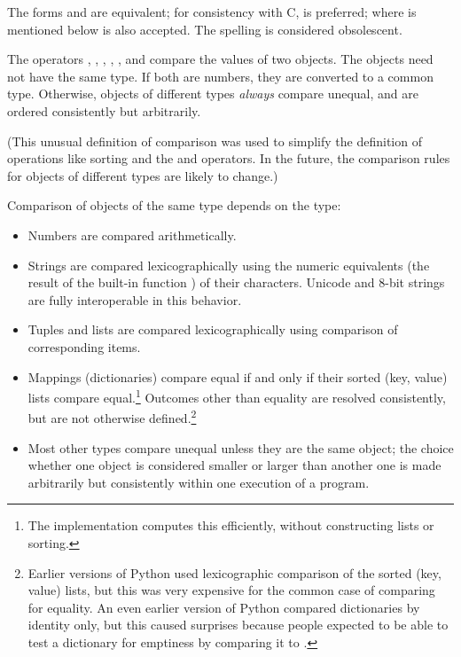 The forms \code{<>} and \code{!=} are equivalent; for consistency with
C, \code{!=} is preferred; where \code{!=} is mentioned below
\code{<>} is also accepted.  The \code{<>} spelling is considered
obsolescent.

The operators \code{<}, \code{>}, \code{==}, \code{>=}, \code{<=}, and
\code{!=} compare
the values of two objects.  The objects need not have the same type.
If both are numbers, they are converted to a common type.  Otherwise,
objects of different types \emph{always} compare unequal, and are
ordered consistently but arbitrarily.

(This unusual definition of comparison was used to simplify the
definition of operations like sorting and the  and
 operators.  In the future, the comparison rules for
objects of different types are likely to change.)

Comparison of objects of the same type depends on the type:

\begin{itemize}

\item
Numbers are compared arithmetically.

\item
Strings are compared lexicographically using the numeric equivalents
(the result of the built-in function ) of their
characters.  Unicode and 8-bit strings are fully interoperable in this
behavior.

\item
Tuples and lists are compared lexicographically using comparison of
corresponding items.

\item
Mappings (dictionaries) compare equal if and only if their sorted
(key, value) lists compare equal.\footnote{The implementation computes
   this efficiently, without constructing lists or sorting.}
Outcomes other than equality are resolved consistently, but are not
otherwise defined.\footnote{Earlier versions of Python used
  lexicographic comparison of the sorted (key, value) lists, but this
  was very expensive for the common case of comparing for equality.  An
  even earlier version of Python compared dictionaries by identity only,
  but this caused surprises because people expected to be able to test
  a dictionary for emptiness by comparing it to \code{\{\}}.}

\item
Most other types compare unequal unless they are the same object;
the choice whether one object is considered smaller or larger than
another one is made arbitrarily but consistently within one
execution of a program.

\end{itemize}

